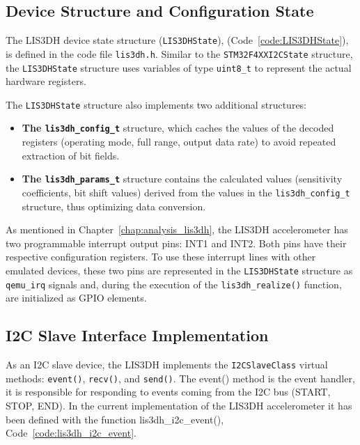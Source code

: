 \subsection{Device Structure and Configuration State}

The LIS3DH device state structure (\texttt{LIS3DHState}), 
(Code~\ref{code:LIS3DHState}), is defined in the code file \texttt{lis3dh.h}. 
Similar to the \texttt{STM32F4XXI2CState} structure, the \texttt{LIS3DHState} 
structure uses variables of type \texttt{uint8\_t} to represent the actual 
hardware registers.

The \texttt{LIS3DHState} structure also implements two additional structures:

\begin{itemize}
    \item \textbf{The \texttt{lis3dh\_config\_t}} structure, which caches the values of the decoded 
    registers (operating mode, full range, output data rate) to avoid repeated 
    extraction of bit fields. 
    
    \item \textbf{The \texttt{lis3dh\_params\_t}} structure contains the calculated values 
    (sensitivity coefficients, bit shift values) derived from the values in the 
    \texttt{lis3dh\_config\_t} structure, thus optimizing data conversion.
\end{itemize}

As mentioned in Chapter~\ref{chap:analysis_lis3dh}, the LIS3DH accelerometer has 
two programmable interrupt output pins: INT1 and INT2. Both pins have their 
respective configuration registers. To use these interrupt lines with other 
emulated devices, these two pins are represented in the \texttt{LIS3DHState} 
structure as \texttt{qemu\_irq} signals and, during the execution of the 
\texttt{lis3dh\_realize()} function, are initialized as GPIO elements.


\subsection{I2C Slave Interface Implementation}

As an I2C slave device, the LIS3DH implements the \texttt{I2CSlaveClass} virtual 
methods: \texttt{event()}, \texttt{recv()}, and \texttt{send()}. The event() method is the event handler, 
it is responsible for responding to events coming from the I2C bus (START, STOP, 
END). In the current implementation of the LIS3DH accelerometer it has been 
defined with the function lis3dh\_i2c\_event(), Code~\ref{code:lis3dh_i2c_event}.


